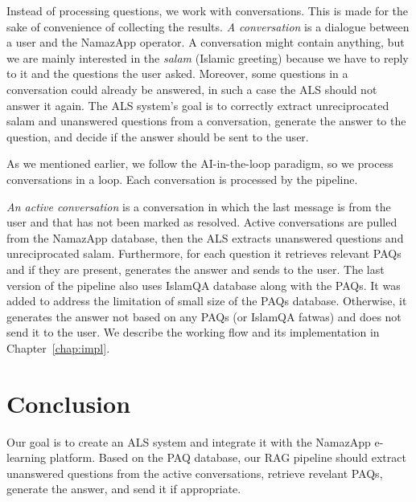 Instead of processing questions, we work with conversations. This is made for the sake of convenience of collecting the results. \textit{A conversation} is a dialogue between a user and the NamazApp operator. A conversation might contain anything, but we are mainly interested in the \textit{salam} (Islamic greeting) because we have to reply to it and the questions the user asked. Moreover, some questions in a conversation could already be answered, in such a case the ALS should not answer it again. The ALS system's goal is to correctly extract unreciprocated salam and unanswered questions from a conversation, generate the answer to the question, and decide if the answer should be sent to the user.

As we mentioned earlier, we follow the AI-in-the-loop paradigm, so we process conversations in a loop. Each conversation is processed by the pipeline.

\textit{An active conversation} is a conversation in which the last message is from the user and that has not been marked as resolved. Active conversations are pulled from the NamazApp database, then the ALS extracts unanswered questions and unreciprocated salam. Furthermore, for each question it retrieves relevant PAQs and if they are present, generates the answer and sends to the user. The last version of the pipeline also uses IslamQA database along with the PAQs. It was added to address the limitation of small size of the PAQs database. Otherwise, it generates the answer not based on any PAQs (or IslamQA fatwas) and does not send it to the user. We describe the working flow and its implementation in Chapter~\ref{chap:impl}. 

\section{Conclusion}

Our goal is to create an ALS system and integrate it with the NamazApp e-learning platform. Based on the PAQ database, our RAG pipeline should extract unanswered questions from the active conversations, retrieve revelant PAQs, generate the answer, and send it if appropriate.






